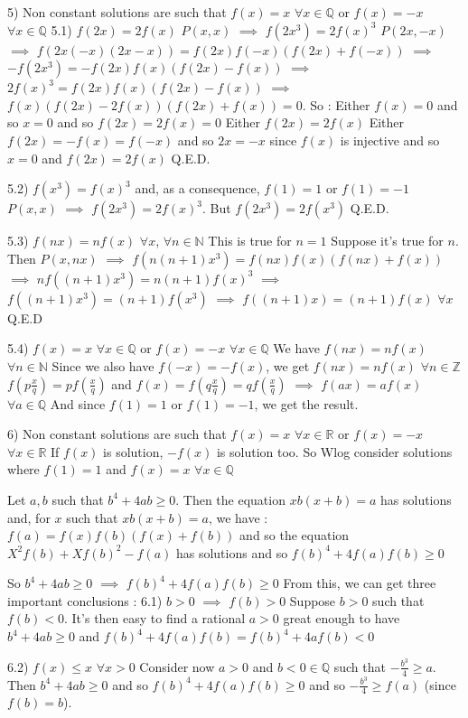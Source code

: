 \begin{solution}
5) Non constant solutions are such that $ f(x)=x$ $ \forall x\in\mathbb Q$ or $ f(x)=-x$ $ \forall x\in\mathbb Q$
5.1) $ f(2x)=2f(x)$
$ P(x,x)$ $ \implies$ $ f(2x^3)=2f(x)^3$
$ P(2x,-x)$ $ \implies$ $ f(2x(-x)(2x-x))=f(2x)f(-x)(f(2x)+f(-x))$ $ \implies$ $ -f(2x^3)=-f(2x)f(x)(f(2x)-f(x))$
$ \implies$ $ 2f(x)^3=f(2x)f(x)(f(2x)-f(x))$
$ \implies$ $ f(x)(f(2x)-2f(x))(f(2x)+f(x))=0$. So :
Either $ f(x)=0$ and so $ x=0$ and so $ f(2x)=2f(x)=0$
Either $ f(2x)=2f(x)$
Either $ f(2x)=-f(x)=f(-x)$ and so $ 2x=-x$ since $ f(x)$ is injective and so $ x=0$ and $ f(2x)=2f(x)$
Q.E.D.

5.2) $ f(x^3)=f(x)^3$ and, as a consequence, $ f(1)=1$ or $ f(1)=-1$
$ P(x,x)$ $ \implies$ $ f(2x^3)=2f(x)^3$. But $ f(2x^3)=2f(x^3)$
Q.E.D.

5.3) $ f(nx)=nf(x)$ $ \forall x$, $ \forall n\in \mathbb N$
This is true for $ n=1$
Suppose it's true for $ n$. Then $ P(x,nx)$ $ \implies$ $ f(n(n+1)x^3)=f(nx)f(x)(f(nx)+f(x))$
$ \implies$ $ nf((n+1)x^3)=n(n+1)f(x)^3$
$ \implies$ $ f((n+1)x^3)=(n+1)f(x^3)$
$ \implies$ $ f((n+1)x)=(n+1)f(x)$ $ \forall x$
Q.E.D

5.4) $ f(x)=x$ $ \forall x\in\mathbb Q$ or $ f(x)=-x$ $ \forall x\in\mathbb Q$
We have $ f(nx)=nf(x)$ $ \forall n\in\mathbb N$
Since we also have $ f(-x)=-f(x)$, we get $ f(nx)=nf(x)$ $ \forall n\in\mathbb Z$
$ f(p\frac xq)=pf(\frac xq)$ and $ f(x)=f(q\frac xq)=qf(\frac xq)$ $ \implies$ $ f(ax)=af(x)$ $ \forall a\in\mathbb Q$
And since $ f(1)=1$ or $ f(1)=-1$, we get the result.

6) Non constant solutions are such that $ f(x)=x$ $ \forall x\in\mathbb R$ or $ f(x)=-x$ $ \forall x\in\mathbb R$
If $ f(x)$ is solution, $ -f(x)$ is solution too. So Wlog consider solutions where $ f(1)=1$ and $ f(x)=x$ $ \forall x\in\mathbb Q$

Let $ a,b$ such that $ b^4+4ab\geq 0$. Then the equation $ xb(x+b)=a$ has solutions and, for $ x$ such that $ xb(x+b)=a$, we have :
$ f(a)=f(x)f(b)(f(x)+f(b))$ and so the equation $ X^2f(b)+Xf(b)^2-f(a)$ has solutions and so $ f(b)^4+4f(a)f(b)\geq 0$

So $ b^4+4ab\geq 0$ $ \implies$ $ f(b)^4+4f(a)f(b)\geq 0$
From this, we can get three important conclusions :
6.1) $ b>0$ $ \implies$ $ f(b)>0$
Suppose $ b>0$ such that $ f(b)<0$. It's then easy to find a rational $ a>0$ great enough to have $ b^4+4ab\geq 0$ and $ f(b)^4+4f(a)f(b)=f(b)^4+4af(b)< 0$

6.2) $ f(x)\leq x$ $ \forall x>0$
Consider now $ a>0$ and $ b<0\in\mathbb Q$ such that $ -\frac{b^3}{4}\geq a$. Then $ b^4+4ab\geq 0$ and so $ f(b)^4+4f(a)f(b)\geq 0$ and so $ -\frac{b^3}{4}\geq f(a)$  (since $ f(b)=b$).


\end{solution}

